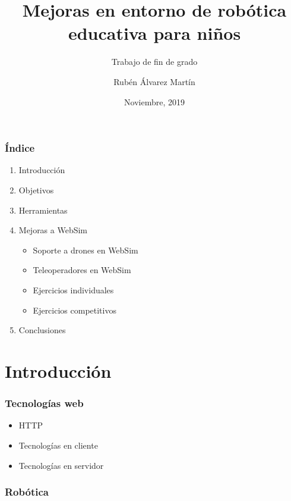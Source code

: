 \documentclass[xcolor={table}]{beamer}
\title{Mejoras en entorno de robótica  educativa para niños}
\subtitle{Trabajo de fin de grado}
\author{Rubén Álvarez Martín}
\date{Noviembre, 2019}
\begin{document}
	\setcounter{showProgressBar}{0}
	\setcounter{showSlideNumbers}{0}

	\frame{\titlepage}

	\begin{frame}
		\frametitle{Índice}
		\begin{enumerate}
			\item Introducción \\ \textcolor{ExecusharesGrey}{}
		 \textcolor{ExecusharesGrey}{\footnotesize\hspace{1em}}
 		\item Objetivos \\ \textcolor{ExecusharesGrey}{}
		 \textcolor{ExecusharesGrey}{\footnotesize\hspace{1em}}
			\item Herramientas \\ \textcolor{ExecusharesGrey}{\footnotesize\hspace{1em}}
			\item Mejoras a WebSim  \textcolor{ExecusharesGrey}{
			\begin{itemize}
			    \item Soporte a drones en WebSim
			    \item Teleoperadores en WebSim
			    \item Ejercicios individuales
			    \item Ejercicios competitivos  \\
			\end{itemize}} 
			\item Conclusiones  \textcolor{ExecusharesGrey}{\footnotesize\hspace{1em}}
		\end{enumerate}
	\end{frame}

	\setcounter{framenumber}{0}
	\setcounter{showProgressBar}{1}
	\setcounter{showSlideNumbers}{1}
	\section{Introducción}
		\begin{frame}
			\frametitle{Tecnologías web}
			\begin{itemize}
			    \item HTTP
			    \item Tecnologías en cliente
			    \item Tecnologías en servidor
			\end{itemize}
		\end{frame}
			\begin{frame}
			\frametitle{Robótica}

		\end{frame}
		
\end{document}
